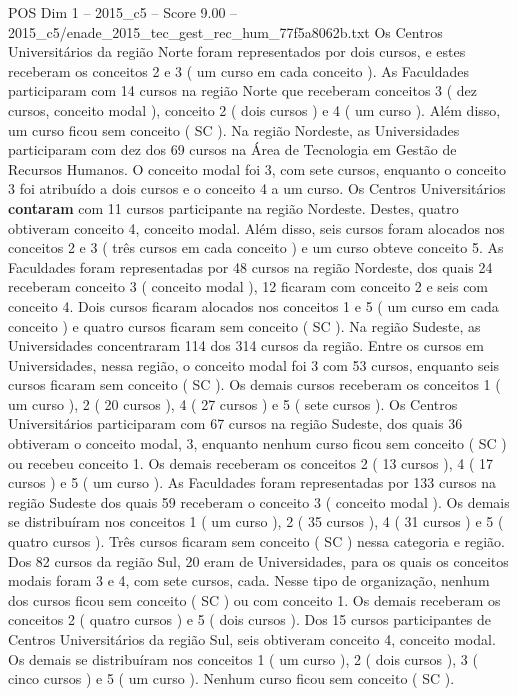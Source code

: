 \begin{textsample}{POS Dim 1 – 2015\_c5 – Score 9.00 – 2015\_c5/enade\_2015\_tec\_gest\_rec\_hum\_77f5a8062b.txt}
Os Centros Universitários da região Norte foram representados por dois cursos, e estes receberam os conceitos 2 e 3 ( um curso em cada conceito ).
As Faculdades participaram com 14 cursos na região Norte que receberam conceitos 3 ( dez cursos, conceito modal ), conceito 2 ( dois cursos ) e 4 ( um curso ).
Além disso, um curso ficou sem conceito ( SC ).
Na região Nordeste, as Universidades participaram com dez dos 69 cursos na Área de Tecnologia em Gestão de Recursos Humanos.
O conceito modal foi 3, com sete cursos, enquanto o conceito 3 foi atribuído a dois cursos e o conceito 4 a um curso.
Os Centros Universitários \textbf{contaram} com 11 cursos participante na região Nordeste.
Destes, quatro obtiveram conceito 4, conceito modal.
Além disso, seis cursos foram alocados nos conceitos 2 e 3 ( três cursos em cada conceito ) e um curso obteve conceito 5.
As Faculdades foram representadas por 48 cursos na região Nordeste, dos quais 24 receberam conceito 3 ( conceito modal ), 12 ficaram com conceito 2 e seis com conceito 4.
Dois cursos ficaram alocados nos conceitos 1 e 5 ( um curso em cada conceito ) e quatro cursos ficaram sem conceito ( SC ).
Na região Sudeste, as Universidades concentraram 114 dos 314 cursos da região.
Entre os cursos em Universidades, nessa região, o conceito modal foi 3 com 53 cursos, enquanto seis cursos ficaram sem conceito ( SC ).
Os demais cursos receberam os conceitos 1 ( um curso ), 2 ( 20 cursos ), 4 ( 27 cursos ) e 5 ( sete cursos ).
Os Centros Universitários participaram com 67 cursos na região Sudeste, dos quais 36 obtiveram o conceito modal, 3, enquanto nenhum curso ficou sem conceito ( SC ) ou recebeu conceito 1.
Os demais receberam os conceitos 2 ( 13 cursos ), 4 ( 17 cursos ) e 5 ( um curso ).
As Faculdades foram representadas por 133 cursos na região Sudeste dos quais 59 receberam o conceito 3 ( conceito modal ).
Os demais se distribuíram nos conceitos 1 ( um curso ), 2 ( 35 cursos ), 4 ( 31 cursos ) e 5 ( quatro cursos ).
Três cursos ficaram sem conceito ( SC ) nessa categoria e região.
Dos 82 cursos da região Sul, 20 eram de Universidades, para os quais os conceitos modais foram 3 e 4, com sete cursos, cada.
Nesse tipo de organização, nenhum dos cursos ficou sem conceito ( SC ) ou com conceito 1.
Os demais receberam os conceitos 2 ( quatro cursos ) e 5 ( dois cursos ).
Dos 15 cursos participantes de Centros Universitários da região Sul, seis obtiveram conceito 4, conceito modal.
Os demais se distribuíram nos conceitos 1 ( um curso ), 2 ( dois cursos ), 3 ( cinco cursos ) e 5 ( um curso ).
Nenhum curso ficou sem conceito ( SC ).

\end{textsample}
